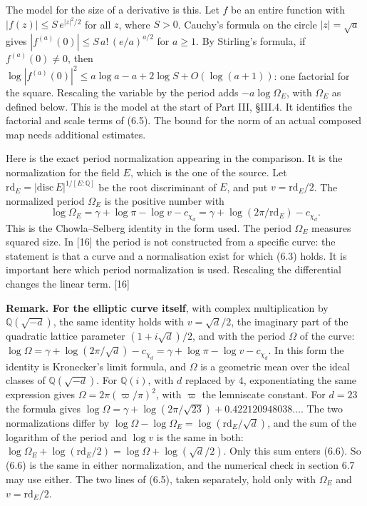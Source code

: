 \documentclass[11pt,letterpaper]{article}
\begin{document}
{The model for the size of a derivative is this. Let $f$ be an entire function with $|f(z)|\le S\,e^{|z|^2/2}$ for all $z$, where $S>0$. Cauchy's formula on the circle $|z|=\sqrt a$ gives $|f^{(a)}(0)|\le S\,a!\,(e/a)^{a/2}$ for $a\ge1$. By Stirling's formula, if $f^{(a)}(0)\ne0$, then $\log|f^{(a)}(0)|^2\le a\log a-a+2\log S+O(\log(a+1))$: one factorial for the square. Rescaling the variable by the period adds $-a\log\Omega_E$, with $\Omega_E$ as defined below. This is the model at the start of Part III, \S III.4. It identifies the factorial and scale terms of (6.5). The bound for the norm of an actual composed map needs additional estimates.

Here is the exact period normalization appearing in the comparison. It is the normalization for the field $E$, which is the one of the source. Let $\mathrm{rd}_E=|\mathrm{disc}\,E|^{1/[E:\mathbb Q]}$ be the root discriminant of $E$, and put $v=\mathrm{rd}_E/2$. The normalized period $\Omega_E$ is the positive number with
\begin{equation}\label{D:93}
 \log\Omega_E=\gamma+\log\pi-\log v-c_{\chi_d}
            =\gamma+\log(2\pi/\mathrm{rd}_E)-c_{\chi_d}.                 \tag{6.3}
\end{equation}
This is the Chowla--Selberg identity in the form used. The period $\Omega_E$ measures squared size. In [16] the period is not constructed from a specific curve: the statement is that a curve and a normalisation exist for which (6.3) holds. It is important here which period normalization is used. Rescaling the differential changes the linear term. [16]

\textbf{Remark. For the elliptic curve itself}, with complex multiplication by $\mathbb Q(\sqrt{-d})$, the same identity holds with $v=\sqrt d/2$, the imaginary part of the quadratic lattice parameter $(1+i\sqrt d)/2$, and with the period $\Omega$ of the curve: $\log\Omega=\gamma+\log(2\pi/\sqrt d)-c_{\chi_d}=\gamma+\log\pi-\log v-c_{\chi_d}$. In this form the identity is Kronecker's limit formula, and $\Omega$ is a geometric mean over the ideal classes of $\mathbb Q(\sqrt{-d})$. For $\mathbb Q(i)$, with $d$ replaced by $4$, exponentiating the same expression gives $\Omega=2\pi(\varpi/\pi)^2$, with $\varpi$ the lemniscate constant. For $d=23$ the formula gives $\log\Omega=\gamma+\log(2\pi/\sqrt{23})+0.422120948038\ldots$. The two normalizations differ by $\log\Omega-\log\Omega_E=\log(\mathrm{rd}_E/\sqrt d)$, and the sum of the logarithm of the period and $\log v$ is the same in both: $\log\Omega_E+\log(\mathrm{rd}_E/2)=\log\Omega+\log(\sqrt d/2)$. Only this sum enters (6.6). So (6.6) is the same in either normalization, and the numerical check in section 6.7 may use either. The two lines of (6.5), taken separately, hold only with $\Omega_E$ and $v=\mathrm{rd}_E/2$.

}
\end{document}
